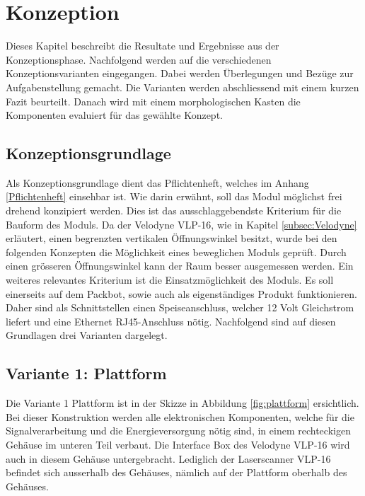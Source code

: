 \chapter{Konzeption}
\label{chap:Konzeption}
Dieses Kapitel beschreibt die Resultate und Ergebnisse aus der Konzeptionsphase. Nachfolgend werden auf die verschiedenen Konzeptionsvarianten eingegangen. Dabei werden Überlegungen und Bezüge zur Aufgabenstellung gemacht. Die Varianten werden abschliessend mit einem kurzen Fazit beurteilt. Danach wird mit einem morphologischen Kasten die Komponenten evaluiert für das gewählte Konzept. 

\section{Konzeptionsgrundlage}
\label{sec:Konzeptiongrund}
Als Konzeptionsgrundlage dient das Pflichtenheft, welches im Anhang \ref{Pflichtenheft} einsehbar ist. Wie darin erwähnt, soll das Modul möglichst frei drehend konzipiert werden. Dies ist das ausschlaggebendste Kriterium für die Bauform des Moduls. Da der Velodyne VLP-16, wie in Kapitel \ref{subsec:Velodyne} erläutert, einen begrenzten vertikalen Öffnungswinkel besitzt, wurde bei den folgenden Konzepten die Möglichkeit eines beweglichen Moduls geprüft. Durch einen grösseren Öffnungswinkel kann der Raum besser ausgemessen werden. Ein weiteres relevantes Kriterium ist die Einsatzmöglichkeit des Moduls. Es soll einerseits auf dem Packbot, sowie auch als eigenständiges Produkt funktionieren. Daher sind als Schnittstellen einen Speiseanschluss, welcher 12 Volt Gleichstrom liefert und eine Ethernet RJ45-Anschluss nötig. Nachfolgend sind auf diesen Grundlagen drei Varianten dargelegt.

\section {Variante 1: Plattform}
\label{sec:var1}
Die Variante 1 Plattform ist in der Skizze in Abbildung \ref{fig:plattform} ersichtlich. Bei dieser Konstruktion werden alle elektronischen Komponenten, welche für die Signalverarbeitung und die Energieversorgung nötig sind, in einem rechteckigen Gehäuse im unteren Teil verbaut. Die Interface Box des Velodyne VLP-16 wird auch in diesem Gehäuse untergebracht. Lediglich der Laserscanner VLP-16 befindet sich ausserhalb des Gehäuses, nämlich auf der Plattform oberhalb des Gehäuses.

